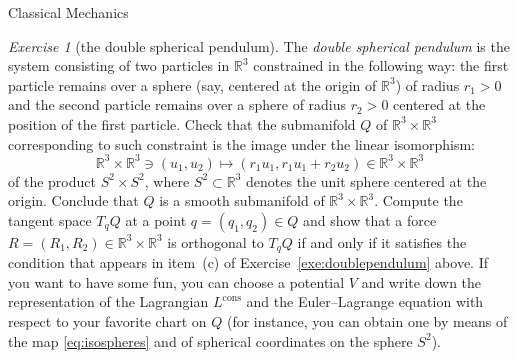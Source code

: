 \documentclass[oneside,a4paper,11pt]{amsbook}
\newcommand{\R}{\mathds R}
\theoremstyle{remark}\newtheorem{exercise}{Exercise}[chapter]
\theoremstyle{plain}\newtheorem{teo}{Theorem}[section]
\theoremstyle{plain}\newtheorem{lem}[teo]{Lemma}
\theoremstyle{plain}\newtheorem{prop}[teo]{Proposition}
\theoremstyle{plain}\newtheorem{cor}[teo]{Corollary}
\theoremstyle{definition}\newtheorem{defin}[teo]{Definition}
\theoremstyle{remark}\newtheorem{rem}[teo]{Remark}
\theoremstyle{definition}\newtheorem{notation}[teo]{Notation}
\theoremstyle{definition}\newtheorem{convention}[teo]{Convention}
\theoremstyle{definition}\newtheorem{example}[teo]{Example}
\numberwithin{section}{chapter}
\numberwithin{equation}{section}
\begin{document}
\begin{chapter}{Classical Mechanics}
\begin{exercise}[the double spherical pendulum]\label{exe:doublespherependulum}
The {\em double spherical pendulum\/} is the system consisting of two particles in $\R^3$ constrained in the following
way: the first particle remains over a sphere (say, centered at the origin of $\R^3$) of radius $r_1>0$ and the
second particle remains over a sphere of radius $r_2>0$ centered at the position of the first particle. Check that
the submanifold $Q$ of $\R^3\times\R^3$ corresponding to such constraint is the image under the linear isomorphism:
\begin{equation}\label{eq:isospheres}
\R^3\times\R^3\ni(u_1,u_2)\longmapsto(r_1u_1,r_1u_1+r_2u_2)\in\R^3\times\R^3
\end{equation}
of the product $S^2\times S^2$, where $S^2\subset\R^3$ denotes the unit sphere centered at the origin.
Conclude that $Q$ is a smooth submanifold of $\R^3\times\R^3$.
Compute the tangent space $T_qQ$ at a point $q=(q_1,q_2)\in Q$ and show that a force $R=(R_1,R_2)\in\R^3\times\R^3$
is orthogonal to $T_qQ$ if and only if it satisfies the condition that appears in item~(c) of Exercise~\ref{exe:doublependulum}
above. If you want to have some fun, you can choose a potential $V$ and write down the representation of the Lagrangian
$L^{\mathrm{cons}}$ and the Euler--Lagrange equation with respect to your favorite chart on $Q$ (for instance,
you can obtain one by means of the map \eqref{eq:isospheres} and of spherical coordinates on the sphere $S^2$).
\end{exercise}


\end{chapter}
\end{document}
